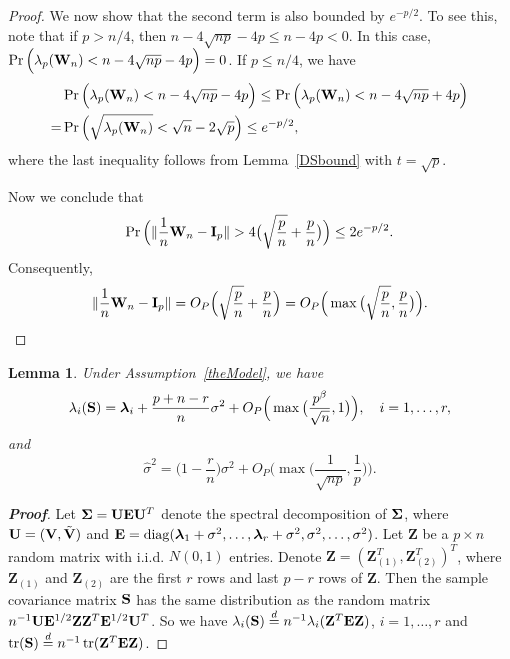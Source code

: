 \documentclass[3p]{elsarticle}
\DeclareMathOperator{\mytr}{tr}
\DeclareMathOperator{\mydiag}{diag}
\newcommand{\bZ}{\mathbf{Z}}
\newcommand{\bfsym}[1]{\ensuremath{\boldsymbol{#1}}}
\def\blambda {\bfsym {\lambda}}        \def\bLambda {\bfsym {\Lambda}}
\theoremstyle{plain}
\newtheorem{lemma}{\quad\quad Lemma}
\theoremstyle{definition}
\theoremstyle{remark}
\begin{document}
\begin{appendices}
\begin{proof}
    We now show that the second term is also bounded by $e^{-p/2}$.
    To see this, note that if $p>n/4$, then $n-4\sqrt{np}-4p\leq n-4p<0$.
    In this case, $\Pr\Big(\lambda_p(\mathbf{W}_n)<n-4\sqrt{np}-4p\Big)=0$.
    If $p\leq n/4$, we have
    $$
    \begin{aligned}
        &\Pr\Big(\lambda_p(\mathbf{W}_n)<n-4\sqrt{np}-4p\Big)
    \leq
    \Pr\Big(\lambda_p(\mathbf{W}_n)<n-4\sqrt{np}+4p\Big)\\
        =&
    \Pr\Big(\sqrt{\lambda_p(\mathbf{W}_n)}<\sqrt{n}-2\sqrt{p}\Big)
        \leq e^{-p/2},
    \end{aligned}
    $$
    where the last inequality follows from Lemma~\ref{DSbound} with $t=\sqrt{p}$.

    Now we conclude that
    $$
    \Pr\Big(\|\frac{1}{n}\BW_n-\BI_p\|>4\big(\sqrt{\frac{p}{n}}+\frac{p}{n}\big)\Big)
    \leq 2 e^{-p/2}.
    $$
    Consequently,
    $$\|\frac{1}{n}\mathbf{W}_n-\mathbf{I}_p\|=O_P\Big(\sqrt{\frac{p}{n}}+\frac{p}{n}\Big)=O_P\Big(\max\big(\sqrt{\frac{p}{n}},\frac{p}{n}\big)\Big).$$
\end{proof}



\begin{lemma}\label{eigenconsisLemma}
    Under Assumption~\ref{theModel}, we have
    \begin{equation}\label{eigenconsisResult1}
        \lambda_i(\BS)= \blambda_i+\frac{p+n-r}{n}\sigma^2+
        O_P\Big(\max\big(\frac{p^{\beta}}{\sqrt{n}},1\big)\Big),\quad i=1,\ldots, r,
    \end{equation}
    and
    \begin{equation}\label{eigenconsisResult2}
        \hat{\sigma}^2=
\big(1-\frac{r}{n}\big)\sigma^2+
O_P\Big(\max\big(\frac{1}{\sqrt{np}},\frac{1}{p}\big)\Big).
    \end{equation}
\end{lemma}
\begin{proof}[\textbf{Proof}]
    Let $\bSigma=\BU\BE\BU^T$ denote the spectral decomposition of $\bSigma$, where
     $\mathbf{U}=(\mathbf{V},\tilde{\mathbf{V}})$ and $\BE=\mydiag(\blambda_1+\sigma^2,\ldots,\blambda_r+\sigma^2,\sigma^2,\ldots,\sigma^2)$.
Let $\bZ$ be a $p\times n$ random matrix with i.i.d. $N(0,1)$ entries.
Denote $\bZ={(\bZ_{(1)}^T,\bZ_{(2)}^T)}^T$, where $\bZ_{(1)}$ and $\bZ_{(2)}$ are the first $r$ rows and last $p-r$ rows of $\bZ$. 
Then the sample covariance matrix $\mathbf{S}$ has the same distribution as the random matrix
$
    n^{-1} \BU \BE^{1/2} \bZ \bZ^T \BE^{1/2} \BU^T
$.
    So we have $\lambda_i(\BS)\overset{d}{=} n^{-1}\lambda_i(\bZ^T \BE \bZ)$, $i=1,\ldots,r$ and $\mytr(\BS)\overset{d}{=} n^{-1}\mytr(\BZ^T \BE \BZ)$.


\end{proof}
\end{appendices}
\end{document}
